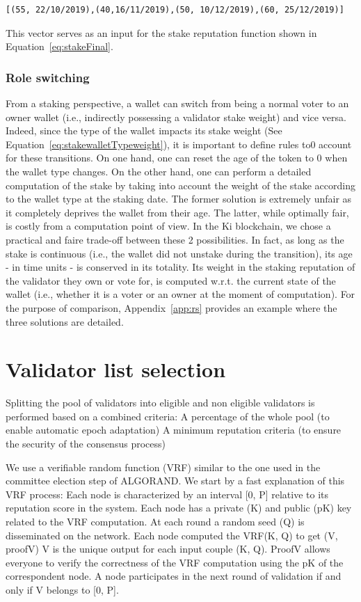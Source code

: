 \documentclass[]{article}
\begin{document}
\begin{lstlisting}[frame=single,  basicstyle=\small]
[(55, 22/10/2019),(40,16/11/2019),(50, 10/12/2019),(60, 25/12/2019)]
\end{lstlisting}
This vector serves as an input for the stake reputation function shown in Equation~\ref{eq:stakeFinal}.

\subsubsection{Role switching}
From a staking perspective, a wallet can switch from being a normal voter to an owner wallet (i.e., indirectly possessing a validator stake weight) and vice versa. Indeed, since the type of the wallet impacts its stake weight (See Equation~\ref{eq:stakewalletTypeweight}), it is important to define rules to0 account for these transitions. On one hand, one can reset the age of the token to 0 when the wallet type changes. On the other hand, one can perform a detailed computation of the stake by taking into account the weight of the stake according to the wallet type at the staking date. The former solution is extremely unfair as it completely deprives the wallet from their age. The latter, while optimally fair, is costly from a computation point of view. In the Ki blockchain, we chose a practical and faire trade-off between these 2 possibilities. In fact, as long as the stake is continuous (i.e., the wallet did not unstake during the transition), its age - in time units - is conserved in its totality. Its weight in the  staking reputation of the validator they own or vote for, is computed w.r.t. the current state of the wallet (i.e., whether it is a voter or an owner at the moment of computation). For the purpose of comparison, Appendix~\ref{app:rs} provides an example where the three solutions are detailed.

\section{Validator list selection}
Splitting the pool of validators into eligible and non eligible validators is performed based on a combined criteria:
A percentage of the whole pool (to enable automatic epoch adaptation)
A minimum reputation criteria (to ensure the security of the consensus process)

We use a verifiable random function (VRF) similar to the one used in the committee election step of ALGORAND. We start by a fast explanation of this VRF process: 
Each node is characterized by an interval [0, P] relative to its reputation score in the system.
Each node has a private (K) and public (pK) key related to the VRF computation.
At each round a random seed (Q) is disseminated on the network.
Each node computed the VRF(K, Q) to get (V, proofV)
V is the unique output for each input couple (K, Q). ProofV allows everyone to verify the correctness of the VRF computation using the pK of the correspondent node.
A node participates in the next round of validation if and only if V belongs to [0, P].
\end{document}
